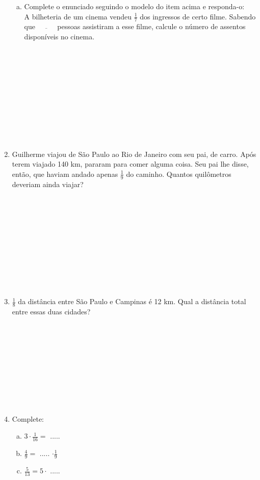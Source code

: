 \documentclass[a4paper,14pt]{article}
\begin{document}
\begin{multicols}{2}
\begin{enumerate}
\begin{enumerate}[a)]
				\item Complete o enunciado seguindo o modelo do item acima e responda-o: \\
				A bilheteria de um cinema vendeu $\frac{1}{7}$ dos ingressos de certo filme. Sabendo que $\overline{~~~~~~~~~~~}$ pessoas assistiram a esse filme, calcule o número de assentos disponíveis no cinema. \\\\\\\\\\\\\\\\\\\\\\
			\end{enumerate}	
			\item Guilherme viajou de São Paulo ao Rio de Janeiro com seu pai, de carro. Após terem viajado 140 km, pararam para comer alguma coisa. Seu pai lhe disse, então, que haviam andado apenas $\frac{1}{9}$ do caminho. Quantos quilômetros deveriam ainda viajar? \\\\\\\\\\\\\\\\\\\\\\
			\item $\frac{1}{8}$ da distância entre São Paulo e Campinas é 12 km. Qual a distância total entre essas duas cidades? \\\\\\\\\\\\\\\\\\\\
			\item Complete:
			\begin{enumerate}[a)]
				\item $3 \cdot \frac{1}{16} = $ .....
				\item $\frac{4}{9} = $ ..... $ \cdot \frac{1}{9}$
				\item $\frac{5}{13} = 5 \cdot $ .....

\end{enumerate}
\end{enumerate}
\end{multicols}
\end{document}

